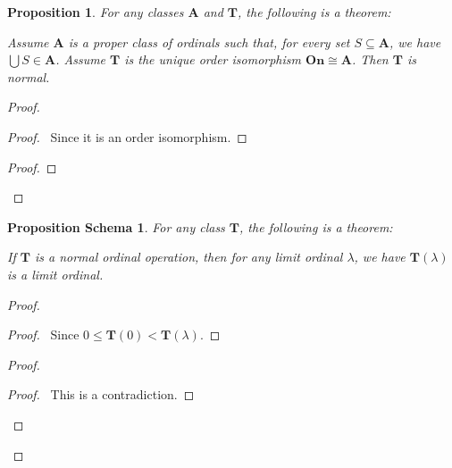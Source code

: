 \documentclass{book}
\let\qed\relax
\newtheorem{prop}[ax]{Proposition}
\newtheorem{props}[ax]{Proposition Schema}
\theoremstyle{definition}
\begin{document}
\begin{prop}
\label{prop:enumerationnormal}
For any classes $\mathbf{A}$ and $\mathbf{T}$, the following is a theorem:

Assume $\mathbf{A}$ is a proper class of ordinals such that, for every set $S \subseteq \mathbf{A}$, we have $\bigcup S \in \mathbf{A}$. Assume $\mathbf{T}$ is the unique order isomorphism $\mathbf{On} \cong \mathbf{A}$. Then $\mathbf{T}$ is normal.
\end{prop}

\begin{proof}
\pf
{}
\begin{proof}
	\pf\ Since it is an order isomorphism.
\end{proof}
\begin{proof}
\end{proof}
\qed
\end{proof}

\begin{props}
For any class $\mathbf{T}$, the following is a theorem:

If $\mathbf{T}$ is a normal ordinal operation, then for any limit ordinal $\lambda$, we have $\mathbf{T}(\lambda)$ is a limit ordinal.
\end{props}

\begin{proof}
\pf
{}
\begin{proof}
	\pf\ Since $0 \leq \mathbf{T}(0) < \mathbf{T}(\lambda)$.
\end{proof}
\begin{proof}
	\qedstep
	\begin{proof}
		\pf\ This is a contradiction.
	\end{proof}
\end{proof}
\qed
\end{proof}
\end{document}
